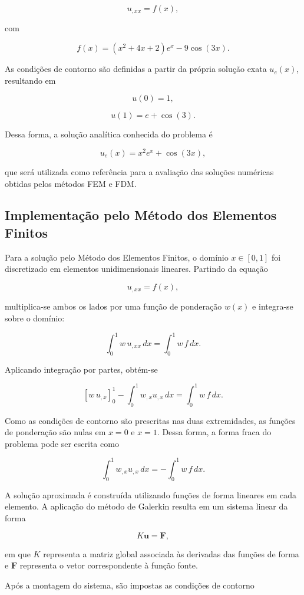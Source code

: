 \[
u_{,xx}=f(x),
\]

com

\[
f(x)
=
(x^2+4x+2)e^x-9\cos(3x).
\]

As condições de contorno são definidas a partir da própria solução exata \(u_e(x)\), resultando em

\[
u(0)=1,
\]

\[
u(1)=e+\cos(3).
\]

Dessa forma, a solução analítica conhecida do problema é

\[
u_e(x)=x^2e^x+\cos(3x),
\]

que será utilizada como referência para a avaliação das soluções numéricas obtidas pelos métodos FEM e FDM.

\subsection{Implementação pelo Método dos Elementos Finitos}

Para a solução pelo Método dos Elementos Finitos, o domínio \(x \in [0,1]\) foi discretizado em elementos unidimensionais lineares. Partindo da equação

\[
u_{,xx}=f(x),
\]

multiplica-se ambos os lados por uma função de ponderação \(w(x)\) e integra-se sobre o domínio:

\[
\int_0^1 w\,u_{,xx}\,dx
=
\int_0^1 w\,f\,dx.
\]

Aplicando integração por partes, obtém-se

\[
\left[w\,u_{,x}\right]_0^1
-
\int_0^1 w_{,x}u_{,x}\,dx
=
\int_0^1 w\,f\,dx.
\]

Como as condições de contorno são prescritas nas duas extremidades, as funções de ponderação são nulas em \(x=0\) e \(x=1\). Dessa forma, a forma fraca do problema pode ser escrita como

\[
\int_0^1 w_{,x}u_{,x}\,dx
=
-
\int_0^1 w\,f\,dx.
\]

A solução aproximada é construída utilizando funções de forma lineares em cada elemento. A aplicação do método de Galerkin resulta em um sistema linear da forma

\[
K\mathbf{u}=\mathbf{F},
\]

em que \(K\) representa a matriz global associada às derivadas das funções de forma e \(\mathbf{F}\) representa o vetor correspondente à função fonte.

Após a montagem do sistema, são impostas as condições de contorno


